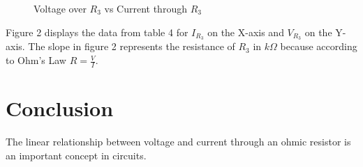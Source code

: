 \documentclass[CMPE]{KGCOEReport}
\begin{document}
\datatable

\begin{figure}[H]
\caption{Voltage over $R_3$ vs Current through $R_3$}
\begin{center}
\end{center}
\end{figure}

Figure 2 displays the data from table 4 for $I_{R_3}$ on the X-axis and $V_{R_3}$ on the Y-axis. The slope in figure 2 represents the resistance of $R_3$ in $k\Omega$ because according to Ohm's Law $R = \frac{V}{I}$.

\section*{Conclusion}

The linear relationship between voltage and current through an ohmic resistor is an important concept in circuits. 
\end{document}
